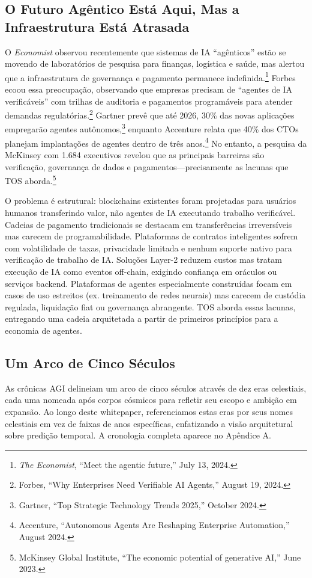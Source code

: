 \documentclass[11pt]{article}
\begin{document}
\subsection{O Futuro Agêntico Está Aqui, Mas a Infraestrutura Está Atrasada}
O \emph{Economist} observou recentemente que sistemas de IA ``agênticos'' estão se movendo de laboratórios de pesquisa para finanças, logística e saúde, mas alertou que a infraestrutura de governança e pagamento permanece indefinida.\footnote{\emph{The Economist}, ``Meet the agentic future,'' July 13, 2024.} Forbes ecoou essa preocupação, observando que empresas precisam de ``agentes de IA verificáveis'' com trilhas de auditoria e pagamentos programáveis para atender demandas regulatórias.\footnote{Forbes, ``Why Enterprises Need Verifiable AI Agents,'' August 19, 2024.} Gartner prevê que até 2026, 30\% das novas aplicações empregarão agentes autônomos,\footnote{Gartner, ``Top Strategic Technology Trends 2025,'' October 2024.} enquanto Accenture relata que 40\% dos CTOs planejam implantações de agentes dentro de três anos.\footnote{Accenture, ``Autonomous Agents Are Reshaping Enterprise Automation,'' August 2024.} No entanto, a pesquisa da McKinsey com 1.684 executivos revelou que as principais barreiras são verificação, governança de dados e pagamentos---precisamente as lacunas que TOS aborda.\footnote{McKinsey Global Institute, ``The economic potential of generative AI,'' June 2023.}

O problema é estrutural: blockchains existentes foram projetadas para usuários humanos transferindo valor, não agentes de IA executando trabalho verificável. Cadeias de pagamento tradicionais se destacam em transferências irreversíveis mas carecem de programabilidade. Plataformas de contratos inteligentes sofrem com volatilidade de taxas, privacidade limitada e nenhum suporte nativo para verificação de trabalho de IA. Soluções Layer-2 reduzem custos mas tratam execução de IA como eventos off-chain, exigindo confiança em oráculos ou serviços backend. Plataformas de agentes especialmente construídas focam em casos de uso estreitos (ex. treinamento de redes neurais) mas carecem de custódia regulada, liquidação fiat ou governança abrangente. TOS aborda essas lacunas, entregando uma cadeia arquitetada a partir de primeiros princípios para a economia de agentes.

\subsection{Um Arco de Cinco Séculos}
As crônicas AGI delineiam um arco de cinco séculos através de dez eras celestiais, cada uma nomeada após corpos cósmicos para refletir seu escopo e ambição em expansão. Ao longo deste whitepaper, referenciamos estas eras por seus nomes celestiais em vez de faixas de anos específicas, enfatizando a visão arquitetural sobre predição temporal. A cronologia completa aparece no Apêndice A.
\end{document}
